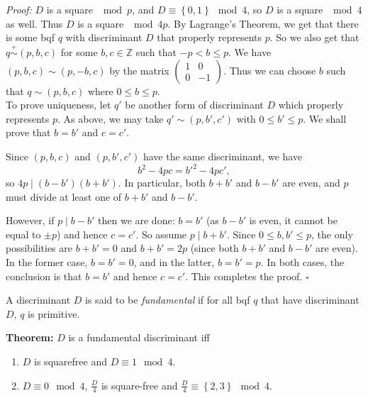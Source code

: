 \documentclass[a4paper,11pt,abstracton]{scrartcl}
\theoremstyle{dotlessP}
\theoremstyle{dotlessS}
\theoremstyle{remark}
\theoremstyle{definition}
\begin{document}
\begin{claim_box}
\textit{Proof:}
$D$ is a square $\mod{p}$, and $D \equiv \left\{0,1\right\} \mod{4}$, so $D$ is a square $\mod{4}$ as well. Thus $D$ is a square $\mod{4p}$. By Lagrange's Theorem, we get that there is some bqf $q$ with discriminant $D$ that properly represents $p$. So we also get that $q \overset{+}{\sim} (p,b,c)$ for some $b,c \in \mathbb{Z}$ such that $-p < b \le p$. We have $(p,b,c) \sim (p,-b,c)$ by the matrix $\begin{pmatrix}
1 &0 \\
0 &-1
\end{pmatrix}$. Thus we can choose $b$ such that $q \sim (p,b,c)$ where $0 \le b \le p$.
\\ To prove uniqueness, let $q'$ be another form of discriminant $D$ which properly represents $p$. As above, we may take $q' \sim (p,b',c')$ with $0 \le b' \le p$. We shall prove that $b = b'$ and $c = c'$.

Since $(p,b,c)$ and $(p,b',c')$ have the same discriminant, we have
\[
  b^2 - 4pc = b'^2 - 4pc',
\]
so $4p \mid (b-b')(b+b')$. In particular, both $b+b'$ and $b-b'$ are even, and $p$ must divide at least one of $b+b'$ and $b-b'$.

However, if $p \mid b-b'$ then we are done: $b = b'$ (as $b-b'$ is even, it cannot be equal to $\pm p$) and hence $c = c'$. So assume $p \mid b+b'$. Since $0 \le b,b' \le p$, the only possibilities are $b+b' = 0$ and $b+b' = 2p$ (since both $b+b'$ and $b-b'$ are even). In the former case, $b = b' = 0$, and in the latter, $b = b' = p$. In both cases, the conclusion is that $b = b'$ and hence $c = c'$. This completes the proof.
\hfill$\square$
\end{claim_box} 

\begin{definition_box}
A discriminant $D$ is said to be \emph{fundamental} if for all bqf $q$ that have discriminant $D$, $q$ is primitive.
\end{definition_box}

\begin{problem_box}
\textbf{Theorem:} 
$D$ is a fundamental discriminant iff
\begin{enumerate}
\item $D$ is squarefree and $D \equiv 1 \mod{4}$.
\item $D \equiv 0 \mod{4}$, $\frac{D}{4}$ is square-free and $\frac{D}{4} \equiv \left\{2,3\right\} \mod{4}$.
\end{enumerate}
\end{problem_box}
\end{document}
